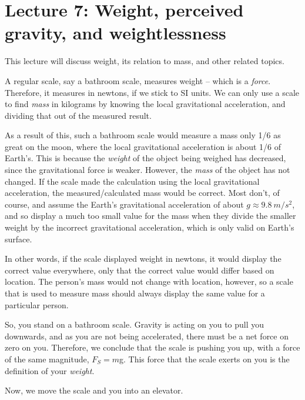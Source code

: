 
\section{Lecture 7: Weight, perceived gravity, and weightlessness}

This lecture will discuss weight, its relation to mass, and other related topics.

A regular scale, say a bathroom scale, measures weight -- which is a \emph{force}. Therefore, it measures in newtons, if we stick to SI units. We can only use a scale to find \emph{mass} in kilograms by knowing the local gravitational acceleration, and dividing that out of the measured result.

As a result of this, such a bathroom scale would measure a mass only 1/6 as great on the moon, where the local gravitational acceleration is about 1/6 of Earth's. This is because the \emph{weight} of the object being weighed has decreased, since the gravitational force is weaker. However, the \emph{mass} of the object has not changed. If the scale made the calculation using the local gravitational acceleration, the measured/calculated mass would be correct. Most don't, of course, and assume the Earth's gravitational acceleration of about $g \approx \SI{9.8}{m/s^2}$, and so display a much too small value for the mass when they divide the smaller weight by the incorrect gravitational acceleration, which is only valid on Earth's surface.

In other words, if the scale displayed weight in newtons, it would display the correct value everywhere, only that the correct value would differ based on location. The person's mass would not change with location, however, so a scale that is used to measure mass should always display the same value for a particular person.

So, you stand on a bathroom scale. Gravity is acting on you to pull you downwards, and as you are not being accelerated, there must be a net force on zero on you. Therefore, we conclude that the scale is pushing you up, with a force of the same magnitude, $F_{S} = m $g. This force that the scale exerts on you is the definition of your \emph{weight}.

Now, we move the scale and you into an elevator.

\begin{figure}[H]
  \centering
{}
\end{figure}

